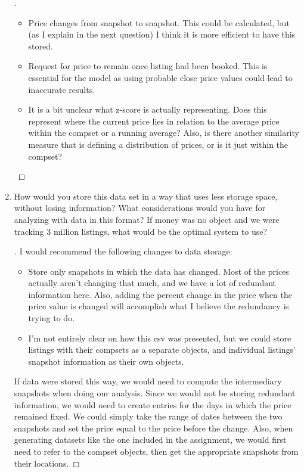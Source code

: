 \documentclass[]{article}
\theoremstyle{definition}
\begin{document}
\begin{enumerate}
\begin{proof}[\unskip\nopunct]
\begin{itemize}
		\item Price changes from snapshot to snapshot. This could be calculated, but (as I explain in the next question) I think it is more efficient to have this stored.

		\item Request for price to remain once listing had been booked. This is essential for the model as using probable close price values could lead to inaccurate results.

		\item It is a bit unclear what z-score is actually representing. Does this represent where the current price lies in relation to the average price within the compset or a running average? Also, is there another similarity measure that is defining a distribution of prices, or is it just within the compset? 

	\end{itemize}	
\end{proof}

\item How would you store this data set in a way that uses less storage space, without losing information?  What considerations would you have for analyzing with data in this format? If money was no object and we were tracking 3 million listings, what would be the optimal system to use?

\begin{proof}[\unskip\nopunct]\renewcommand{\qedsymbol}{}

I would recommend the following changes to data storage:

	\begin{itemize}
		\item Store only snapshots in which the data has changed. Most of the prices actually aren't changing that much, and we have a lot of redundant information here. Also, adding the percent change in the price when the price value is changed will accomplish what I believe the redundancy is trying to do.

		\item I'm not entirely clear on how this csv was presented, but we could store listings with their compsets as a separate objects, and individual listings' snapshot information as their own objects.

	\end{itemize}

If data were stored this way, we would need to compute the intermediary snapshots when doing our analysis. Since we would not be storing redundant information, we would need to create entries for the days in which the price remained fixed. We could simply take the range of dates between the two snapshots and set the price equal to the price before the change. Also, when generating datasets like the one included in the assignment, we would first need to refer to the compset objects, then get the appropriate snapshots from their locations.


\end{proof}
\end{enumerate}
\end{document}
